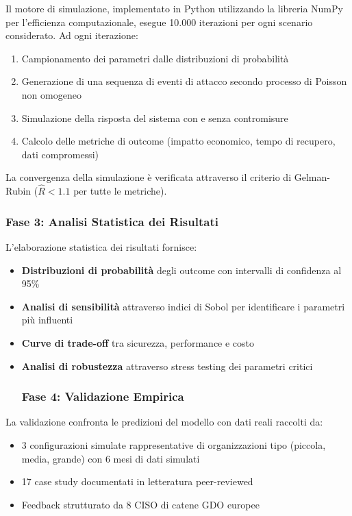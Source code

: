 Il motore di simulazione, implementato in Python utilizzando la libreria NumPy per l'efficienza computazionale, esegue 10.000 iterazioni per ogni scenario considerato. Ad ogni iterazione:

\begin{enumerate}
    \item Campionamento dei parametri dalle distribuzioni di probabilità
    \item Generazione di una sequenza di eventi di attacco secondo processo di Poisson non omogeneo
    \item Simulazione della risposta del sistema con e senza contromisure
    \item Calcolo delle metriche di outcome (impatto economico, tempo di recupero, dati compromessi)
\end{enumerate}

La convergenza della simulazione è verificata attraverso il criterio di Gelman-Rubin ($\hat{R} < 1.1$ per tutte le metriche).

\subsubsection{\texorpdfstring{Fase 3: Analisi Statistica dei Risultati}{2.5.1.3 - Fase 3: Analisi Statistica dei Risultati}}

L'elaborazione statistica dei risultati fornisce:
\begin{itemize}
    \item \textbf{Distribuzioni di probabilità} degli outcome con intervalli di confidenza al 95\%
    \item \textbf{Analisi di sensibilità} attraverso indici di Sobol per identificare i parametri più influenti
    \item \textbf{Curve di trade-off} tra sicurezza, performance e costo
    \item \textbf{Analisi di robustezza} attraverso stress testing dei parametri critici

    \subsubsection{\texorpdfstring{Fase 4: Validazione Empirica}{2.5.1.4 - Fase 4: Validazione Empirica}}
\end{itemize}

La validazione confronta le predizioni del modello con dati reali raccolti da:
\begin{itemize}
    \item 3 configurazioni simulate rappresentative di organizzazioni tipo (piccola, media, grande) con 6 mesi di dati simulati
    \item 17 case study documentati in letteratura peer-reviewed
    \item Feedback strutturato da 8 CISO di catene GDO europee
\end{itemize}

